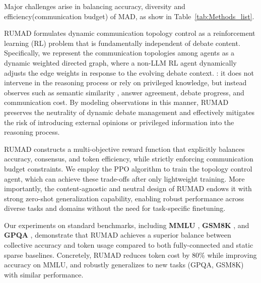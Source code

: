 Major challenges arise in balancing accuracy, diversity and efficiency(communication budget) of MAD, as show in Table~\ref{tab:Methods_list}.  

RUMAD formulates dynamic communication topology control as a reinforcement learning (RL) problem that is fundamentally independent of debate content. Specifically, we represent the communication topologies among agents as a dynamic weighted directed graph, where a non-LLM RL agent dynamically adjusts the edge weights in response to the evolving debate context. : it does not intervene in the reasoning process or rely on privileged knowledge, but instead observes  such as semantic similarity , answer agreement, debate progress, and communication cost. By modeling observations in this manner, RUMAD preserves the neutrality of dynamic debate management and effectively mitigates the risk of introducing external opinions or privileged information into the reasoning process. 

RUMAD constructs a multi-objective reward function that explicitly balances accuracy, consensus, and token efficiency, while strictly enforcing communication budget constraints. We employ the PPO algorithm to train the topology control agent, which can achieve these trade-offs after only lightweight training. More importantly, the content-agnostic and neutral design of RUMAD endows it with strong zero-shot generalization capability, enabling robust performance across diverse tasks and domains without the need for task-specific finetuning.

Our experiments on standard benchmarks, including \textbf{MMLU} \citep{hendrycks2020measuring}, \textbf{GSM8K} \citep{cobbe2021training}, and \textbf{GPQA} \citep{reinGPQAGraduateLevelGoogleProof2023}, demonstrate that RUMAD achieves a superior balance between collective accuracy and token usage compared to both fully-connected and static sparse baselines.  Concretely, RUMAD reduces token cost by 80\% while improving accuracy on MMLU, and robustly generalizes to new tasks (GPQA, GSM8K) with similar performance.

